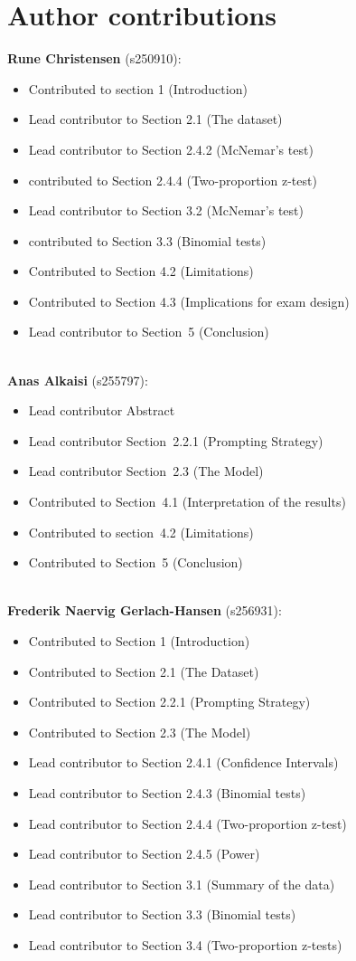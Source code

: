 \documentclass{article}
\begin{document}
\section*{Author contributions}
{\small\noindent
\textbf{Rune Christensen} (s250910): 
\begin{itemize}
    \item Contributed to section 1 (Introduction)
    \item Lead contributor to Section 2.1 (The dataset)
    \item Lead contributor to Section 2.4.2 (McNemar's test)
    \item contributed to Section 2.4.4 (Two-proportion z-test)
    \item Lead contributor to Section 3.2 (McNemar's test)
    \item contributed to Section 3.3 (Binomial tests)
    \item Contributed to Section 4.2 (Limitations)
    \item Contributed to Section 4.3 (Implications for exam design)
    \item Lead contributor to Section~5 (Conclusion)
\end{itemize}
\\
\textbf{Anas Alkaisi} (s255797):
\begin{itemize}
    \item Lead contributor Abstract
    \item Lead contributor Section~2.2.1 (Prompting Strategy)
    \item Lead contributor Section~2.3 (The Model)
    \item Contributed to Section~4.1 (Interpretation of the results)
    \item Contributed to section~4.2 (Limitations)
    \item Contributed to Section~5 (Conclusion)
\end{itemize}
    \\
\textbf{Frederik Naervig Gerlach-Hansen} (s256931): \begin{itemize}
    \item Contributed to Section 1 (Introduction)
    \item Contributed to Section 2.1 (The Dataset) 
    \item Contributed to Section 2.2.1 (Prompting Strategy)
    \item Contributed to Section 2.3 (The Model)
    \item Lead contributor to Section 2.4.1 (Confidence Intervals)
    \item Lead contributor to Section 2.4.3 (Binomial tests)
    \item Lead contributor to Section 2.4.4 (Two-proportion z-test)
    \item Lead contributor to Section 2.4.5 (Power)
    \item Lead contributor to Section 3.1 (Summary of the data)
    \item Lead contributor to Section 3.3 (Binomial tests)
    \item Lead contributor to Section 3.4 (Two-proportion z-tests)
    
\end{itemize}}
\end{document}
